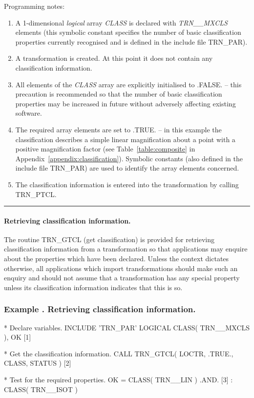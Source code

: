 \documentclass[twoside,nolof,11pt]{starlink}
\providecommand{\name}[1]{\small{#1}}
\providecommand{\fortvar}[1]{\emph{#1}}
\newcounter{examplecounter}
\providecommand{\example}[1]{\addtocounter{examplecounter}{1}
                         \subsubsection*{Example \theexamplecounter. #1}}
\providecommand{\exampledone}[0]{\begin{center} \rule{6em}{0.2mm} \end{center}}
\begin{document}
Programming notes:

\begin{enumerate}

\item A 1-dimensional \emph{logical} array \fortvar{CLASS} is declared with
\fortvar{TRN\_\_MXCLS} elements (this symbolic constant specifies the number
of basic classification properties currently recognised and is defined in
the include file \name{TRN\_PAR}).

\item A transformation is created.
At this point it does not contain any classification information.

\item All elements of the \fortvar{CLASS} array are explicitly initialised
to \name{.FALSE.} -- this precaution is recommended so that the number of
basic classification properties may be increased in future without adversely
affecting existing software.

\item The required array elements are set to \name{.TRUE.} -- in this
example the classification describes a simple linear magnification about a
point with a positive magnification factor (see Table~\ref{table:composite}
in Appendix~\ref{appendix:classification}).
Symbolic constants (also defined in the include file \name{TRN\_PAR}) are
used to identify the array elements concerned.

\item The classification information is entered into the transformation by
calling \name{TRN\_PTCL}.

\end{enumerate}
\exampledone

\paragraph{Retrieving classification information.}
The routine \name{TRN\_GTCL} (get classification) is provided for retrieving
classification information from a transformation so that applications may
enquire about the properties which have been declared.
Unless the context dictates otherwise, all applications which import
transformations should make such an enquiry and should not assume that a
transformation has any special property unless its classification
information indicates that this is so.

\example{Retrieving classification information.}

\begin{terminalv}
*  Declare variables.
      INCLUDE 'TRN_PAR'
      LOGICAL CLASS( TRN__MXCLS ), OK                  [1]

*  Get the classification information.
      CALL TRN_GTCL( LOCTR, .TRUE., CLASS, STATUS )    [2]

*  Test for the required properties.
      OK = CLASS( TRN__LIN ) .AND.                     [3]
     :     CLASS( TRN__ISOT )
\end{terminalv}
\end{document}
